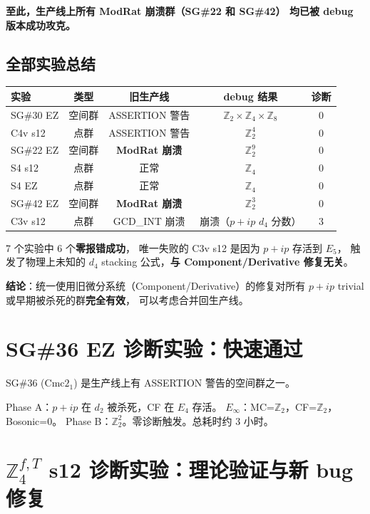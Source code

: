 \documentclass[a4paper,fontset=ubuntu,12pt]{ctexart}
\begin{document}
\textbf{至此，生产线上所有 ModRat 崩溃群（SG\#22 和 SG\#42）
均已被 debug 版本成功攻克。}

\subsection{全部实验总结}

\begin{center}
\begin{tabular}{l|cccc}
\hline
实验 & 类型 & 旧生产线 & debug 结果 & 诊断 \\
\hline
SG\#30 EZ & 空间群 & ASSERTION 警告 & $\mathbb{Z}_2 \times \mathbb{Z}_4 \times \mathbb{Z}_8$ & 0 \\
C4v s12 & 点群 & ASSERTION 警告 & $\mathbb{Z}_2^4$ & 0 \\
SG\#22 EZ & 空间群 & \textbf{ModRat 崩溃} & $\mathbb{Z}_2^9$ & 0 \\
S4 s12 & 点群 & 正常 & $\mathbb{Z}_4$ & 0 \\
S4 EZ & 点群 & 正常 & $\mathbb{Z}_4$ & 0 \\
SG\#42 EZ & 空间群 & \textbf{ModRat 崩溃} & $\mathbb{Z}_2^3$ & 0 \\
C3v s12 & 点群 & GCD\_INT 崩溃 & 崩溃（$p{+}ip$ $d_4$ 分数） & 3 \\
\hline
\end{tabular}
\end{center}

7 个实验中 6 个\textbf{零报错成功}，
唯一失败的 C3v s12 是因为 $p{+}ip$ 存活到 $E_5$，
触发了物理上未知的 $d_4$ stacking 公式，\textbf{与 Component/Derivative 修复无关}。

\textbf{结论}：统一使用旧微分系统（Component/Derivative）的修复对所有
$p{+}ip$ trivial 或早期被杀死的群\textbf{完全有效}，
可以考虑合并回生产线。

\section{SG\#36 EZ 诊断实验：快速通过}
\label{sec:sg36-ez-success}

SG\#36 (Cmc$2_1$) 是生产线上有 ASSERTION 警告的空间群之一。

Phase A：$p{+}ip$ 在 $d_2$ 被杀死，CF 在 $E_4$ 存活。
$E_\infty$：MC=$\mathbb{Z}_2$，CF=$\mathbb{Z}_2$，Bosonic=$0$。
Phase B：$\mathbb{Z}_2^2$。零诊断触发。总耗时约 3 小时。

\section{$\mathbb{Z}_4^{f,T}$ s12 诊断实验：理论验证与新 bug 修复}
\label{sec:z4ft-s12}
\end{document}
